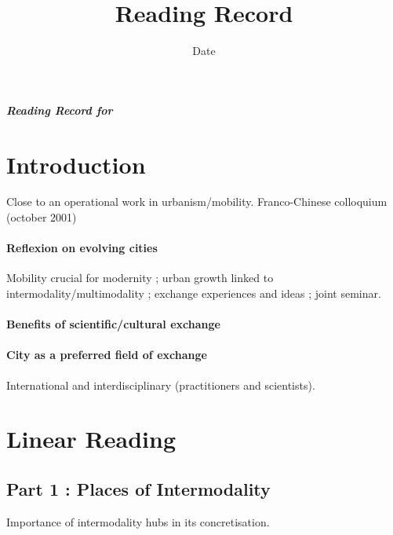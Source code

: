 


\title{Reading Record\bigskip\\
\cite{pan2003croissance}
}
\author{}
\date{Date}


\maketitle

\textbf{\textit{Reading Record for \cite{pan2003croissance}}}


\section{Introduction}

Close to an operational work in urbanism/mobility. Franco-Chinese colloquium (october 2001)

\paragraph{Reflexion on evolving cities} 

Mobility crucial for modernity ; urban growth linked to intermodality/multimodality ; exchange experiences and ideas ; joint seminar.

\paragraph{Benefits of scientific/cultural exchange}

\paragraph{City as a preferred field of exchange}

International and interdisciplinary (practitioners and scientists). 



\section{Linear Reading}

\subsection{Part 1 : Places of Intermodality}

Importance of intermodality hubs in its concretisation.

